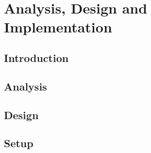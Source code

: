 \chapter{Analysis, Design and Implementation}

\section{Introduction}


\section{Analysis}

\section{Design}

\section{Setup}


